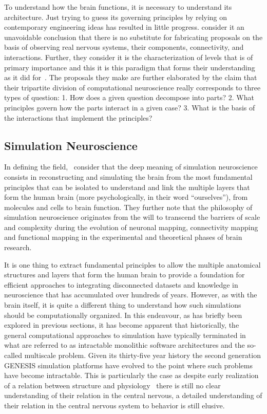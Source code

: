 \documentclass[11pt,3p,twocolumn]{JMN}
\begin{document}
To understand how the brain functions, it is necessary to understand its architecture. Just trying to guess its governing principles by relying on contemporary engineering ideas has resulted in little progress. \citet*{Churchland:1992uq} consider it an unavoidable conclusion that there is no substitute for fabricating proposals on the basis of observing real nervous systems, their components, connectivity, and interactions. Further, they consider it is the characterization of levels that is of primary importance and this it is this paradigm that forms their understanding as it did for~\citet{Marr:1982fk}. The proposals they make are further elaborated by the claim that their tripartite division of computational neuroscience really corresponds to three types of question: 1. How does a given question decompose into parts? 2. What principles govern how the parts interact in a given case? 3. What is the basis of the interactions that implement the principles?

\subsection{Simulation Neuroscience}
\label{subsection:simneuro}

In defining the field,~\cite{fan19} consider that the deep meaning of simulation neuroscience consists in reconstructing and simulating the brain from the most fundamental principles that can be isolated to understand and link the multiple layers that form the human brain (more psychologically, in their word ``ourselves''), from molecules and cells to brain function. They further note that the philosophy of simulation neuroscience originates from the will to transcend the barriers of scale and complexity during the evolution of neuronal mapping, connectivity mapping and functional mapping in the experimental and theoretical phases of brain research.

It is one thing to extract fundamental principles to allow the multiple anatomical structures and layers that form the human brain to provide a foundation for efficient approaches to integrating disconnected datasets and knowledge in neuroscience that has accumulated over hundreds of years. However, as with the brain itself, it is quite a different thing to understand how such simulations should be computationally organized. In this endeavour, as has briefly been explored in previous sections, it has become apparent that historically, the general computational approaches to simulation have typically terminated in what are referred to as intractable monolithic software architectures and the so-called multiscale problem. Given its thirty-five year history the second generation GENESIS simulation platforms have evolved to the point where such problems have become intractable. This is particularly the case as despite early realization of a relation between structure and physiology~\citep[see, for example][]{sieck17} there is still no clear understanding of their relation in the central nervous, a detailed understanding of their relation in the central nervous system to behavior is still elusive.
\end{document}
